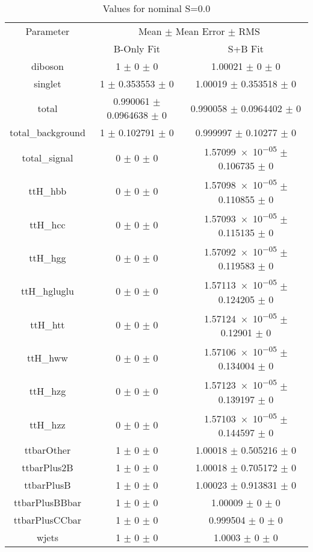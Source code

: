 \begin{table}
\centering
\caption{Values for nominal S=0.0}
\begin{tabular}{ccc}
\toprule
Parameter & \multicolumn{2}{c}{Mean $\pm$ Mean Error $\pm$ RMS}\\
 & B-Only Fit & S+B Fit\\
\midrule
diboson & \num{1} $\pm$ \num{0} $\pm$ \num{0} & \num{1.00021} $\pm$ \num{0} $\pm$ \num{0}\\
singlet & \num{1} $\pm$ \num{0.353553} $\pm$ \num{0} & \num{1.00019} $\pm$ \num{0.353518} $\pm$ \num{0}\\
total & \num{0.990061} $\pm$ \num{0.0964638} $\pm$ \num{0} & \num{0.990058} $\pm$ \num{0.0964402} $\pm$ \num{0}\\
total\_background & \num{1} $\pm$ \num{0.102791} $\pm$ \num{0} & \num{0.999997} $\pm$ \num{0.10277} $\pm$ \num{0}\\
total\_signal & \num{0} $\pm$ \num{0} $\pm$ \num{0} & \num{1.57099e-05} $\pm$ \num{0.106735} $\pm$ \num{0}\\
ttH\_hbb & \num{0} $\pm$ \num{0} $\pm$ \num{0} & \num{1.57098e-05} $\pm$ \num{0.110855} $\pm$ \num{0}\\
ttH\_hcc & \num{0} $\pm$ \num{0} $\pm$ \num{0} & \num{1.57093e-05} $\pm$ \num{0.115135} $\pm$ \num{0}\\
ttH\_hgg & \num{0} $\pm$ \num{0} $\pm$ \num{0} & \num{1.57092e-05} $\pm$ \num{0.119583} $\pm$ \num{0}\\
ttH\_hgluglu & \num{0} $\pm$ \num{0} $\pm$ \num{0} & \num{1.57113e-05} $\pm$ \num{0.124205} $\pm$ \num{0}\\
ttH\_htt & \num{0} $\pm$ \num{0} $\pm$ \num{0} & \num{1.57124e-05} $\pm$ \num{0.12901} $\pm$ \num{0}\\
ttH\_hww & \num{0} $\pm$ \num{0} $\pm$ \num{0} & \num{1.57106e-05} $\pm$ \num{0.134004} $\pm$ \num{0}\\
ttH\_hzg & \num{0} $\pm$ \num{0} $\pm$ \num{0} & \num{1.57123e-05} $\pm$ \num{0.139197} $\pm$ \num{0}\\
ttH\_hzz & \num{0} $\pm$ \num{0} $\pm$ \num{0} & \num{1.57103e-05} $\pm$ \num{0.144597} $\pm$ \num{0}\\
ttbarOther & \num{1} $\pm$ \num{0} $\pm$ \num{0} & \num{1.00018} $\pm$ \num{0.505216} $\pm$ \num{0}\\
ttbarPlus2B & \num{1} $\pm$ \num{0} $\pm$ \num{0} & \num{1.00018} $\pm$ \num{0.705172} $\pm$ \num{0}\\
ttbarPlusB & \num{1} $\pm$ \num{0} $\pm$ \num{0} & \num{1.00023} $\pm$ \num{0.913831} $\pm$ \num{0}\\
ttbarPlusBBbar & \num{1} $\pm$ \num{0} $\pm$ \num{0} & \num{1.00009} $\pm$ \num{0} $\pm$ \num{0}\\
ttbarPlusCCbar & \num{1} $\pm$ \num{0} $\pm$ \num{0} & \num{0.999504} $\pm$ \num{0} $\pm$ \num{0}\\
wjets & \num{1} $\pm$ \num{0} $\pm$ \num{0} & \num{1.0003} $\pm$ \num{0} $\pm$ \num{0}\\
\bottomrule
\end{tabular}
\end{table}